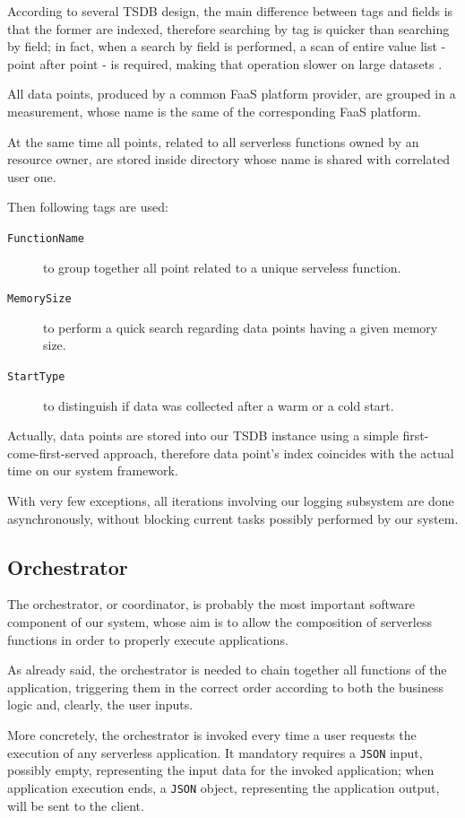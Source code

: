 \documentclass[12pt,a4paper]{report}
\begin{document}
According to several TSDB design, the main difference between tags and fields is that the former are indexed, therefore searching by tag is quicker than searching by field; in fact, when a search by field is performed, a scan of entire value list - point after point - is required, making that operation slower on large datasets \cite{IOTTSDB}.

All data points, produced by a common FaaS platform provider, are grouped in a measurement, whose name is the same of the corresponding FaaS platform. 

At the same time all points, related to all serverless functions owned by an resource owner, are stored inside directory whose name is shared with correlated user one.

Then following tags are used: 

\begin{description}
	\item[\texttt{FunctionName}] to group together all point related to a unique serveless function. 
	\item[\texttt{MemorySize}] to perform a quick search regarding data points having a given memory size.
	\item[\texttt{StartType}] to distinguish if data was collected after a warm or a cold start.
\end{description}

Actually, data points are stored into our TSDB instance using a simple first-come-first-served approach, therefore data point's index coincides with the actual time on our system framework. 

With very few exceptions, all iterations involving our logging subsystem are done asynchronously, without blocking current tasks possibly performed by our system.  

\subsection{Orchestrator}
	
The orchestrator, or coordinator, is probably the most important software component of our system, whose aim is to allow the composition of serverless functions in order to properly execute applications.

As already said, the orchestrator is needed to chain together all functions of the application, triggering them in the correct order according to both the business logic and, clearly, the user inputs.

More concretely, the orchestrator is invoked every time a user requests the execution of any serverless application. It mandatory requires a \texttt{JSON} input, possibly empty, representing the input data for the invoked application; when application execution ends, a \texttt{JSON} object, representing the application output, will be sent to the client.
\end{document}
